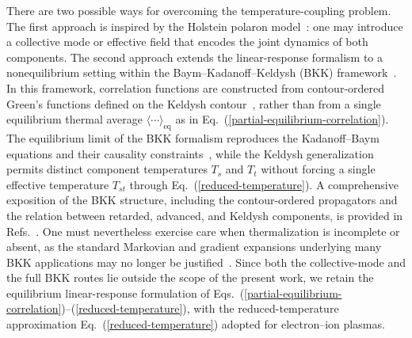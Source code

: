 \documentclass[aps,showkeys,noshowpacs,superscriptaddress,pre,preprint]{revtex4-2}
\begin{document}
There are two possible ways for overcoming the temperature-coupling problem.
The first approach is inspired by the Holstein polaron model~\cite{Holstein1959}:
one may introduce a collective mode or effective field that encodes the joint dynamics of both components.
The second approach extends the linear-response formalism to a nonequilibrium setting
within the Baym--Kadanoff--Keldysh (BKK) framework~\cite{Kadanoff1962,Stefanucci2013,Kim2018}.
In this framework, correlation functions are constructed from contour-ordered Green's functions
defined on the Keldysh contour~\cite{Stefanucci2013,Kim2018},
rather than from a single equilibrium thermal average $\langle \cdots \rangle_\mathrm{eq}$
as in Eq.~(\ref{partial-equilibrium-correlation}).
The equilibrium limit of the BKK formalism reproduces the Kadanoff--Baym equations
and their causality constraints~\cite{Kadanoff1962},
while the Keldysh generalization permits distinct component temperatures $T_s$ and $T_t$
without forcing a single effective temperature $T_{st}$ through Eq.~(\ref{reduced-temperature}).
A comprehensive exposition of the BKK structure, including the contour-ordered propagators
and the relation between retarded, advanced, and Keldysh components,
is provided in Refs.~\cite{Stefanucci2013,Kim2018}.
One must nevertheless exercise care when thermalization is incomplete or absent,
as the standard Markovian and gradient expansions underlying many BKK applications
may no longer be justified~\cite{Stefanucci2013}.
Since both the collective-mode and the full BKK routes lie outside the scope of the present work,
we retain the equilibrium linear-response formulation of Eqs.~(\ref{partial-equilibrium-correlation})--(\ref{reduced-temperature}),
with the reduced-temperature approximation Eq.~(\ref{reduced-temperature}) adopted for electron--ion plasmas.
\end{document}
